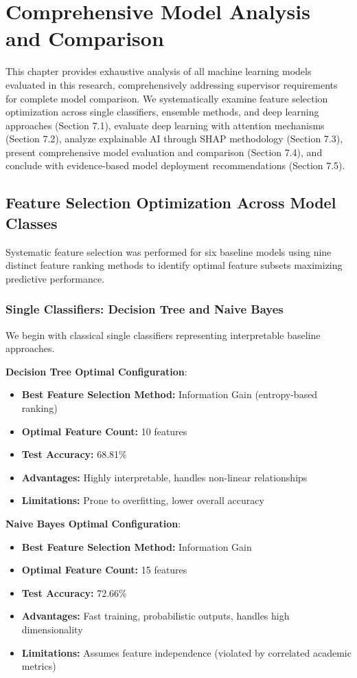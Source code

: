 \chapter{Comprehensive Model Analysis and Comparison}

This chapter provides exhaustive analysis of all machine learning models evaluated in this research, comprehensively addressing supervisor requirements for complete model comparison. We systematically examine feature selection optimization across single classifiers, ensemble methods, and deep learning approaches (Section 7.1), evaluate deep learning with attention mechanisms (Section 7.2), analyze explainable AI through SHAP methodology (Section 7.3), present comprehensive model evaluation and comparison (Section 7.4), and conclude with evidence-based model deployment recommendations (Section 7.5).

\section{Feature Selection Optimization Across Model Classes}

Systematic feature selection was performed for six baseline models using nine distinct feature ranking methods to identify optimal feature subsets maximizing predictive performance.

\subsection{Single Classifiers: Decision Tree and Naive Bayes}

We begin with classical single classifiers representing interpretable baseline approaches.

\textbf{Decision Tree Optimal Configuration}:
\begin{itemize}
\item \textbf{Best Feature Selection Method:} Information Gain (entropy-based ranking)
\item \textbf{Optimal Feature Count:} 10 features
\item \textbf{Test Accuracy:} 68.81\%
\item \textbf{Advantages:} Highly interpretable, handles non-linear relationships
\item \textbf{Limitations:} Prone to overfitting, lower overall accuracy
\end{itemize}

\textbf{Naive Bayes Optimal Configuration}:
\begin{itemize}
\item \textbf{Best Feature Selection Method:} Information Gain
\item \textbf{Optimal Feature Count:} 15 features
\item \textbf{Test Accuracy:} 72.66\%
\item \textbf{Advantages:} Fast training, probabilistic outputs, handles high dimensionality
\item \textbf{Limitations:} Assumes feature independence (violated by correlated academic metrics)
\end{itemize}

